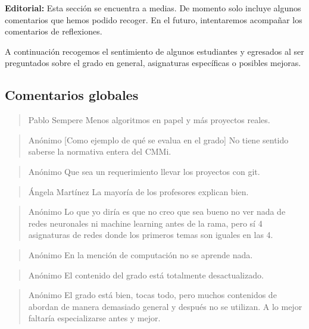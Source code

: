 \textbf{Editorial:} Esta sección se encuentra a medias.
De momento solo incluye algunos comentarios que hemos podido recoger.
En el futuro, intentaremos acompañar los comentarios de reflexiones.

A continuación recogemos el sentimiento de algunos estudiantes y egresados
al ser preguntados sobre
el grado en general, asignaturas específicas o posibles mejoras.

\subsection{Comentarios globales}

\begin{quote}{Pablo Sempere}\label{qte:less-algorithms-in-paper}
    Menos algoritmos en papel y más proyectos reales.
\end{quote}

\begin{quote}{Anónimo}\label{qte:cmmi}
    [Como ejemplo de qué se evalua en el grado]
    No tiene sentido saberse la normativa entera del CMMi.
\end{quote}

\begin{quote}{Anónimo}
    Que sea un requerimiento llevar los proyectos con git.
\end{quote}

\begin{quote}{Ángela Martínez}
    La mayoría de los profesores explican bien.
\end{quote}

\begin{quote}{Anónimo}
    Lo que yo diría es que no creo que sea bueno
    no ver nada de redes neuronales ni machine learning antes de la rama,
    pero sí 4 asignaturas de redes donde los primeros temas
    son iguales en las 4.
\end{quote}

\begin{quote}{Anónimo}
    En la mención de computación no se aprende nada.
\end{quote}

\begin{quote}{Anónimo}
    El contenido del grado está totalmente desactualizado.
\end{quote}

\begin{quote}{Anónimo}
    El grado está bien, tocas todo,
    pero muchos contenidos de abordan de manera demasiado general y
    después no se utilizan.
    A lo mejor faltaría especializarse antes y mejor.
\end{quote}

